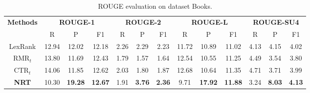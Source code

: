 \documentclass[sigconf]{acmart}
\begin{document}
\begin{table*}[!htb]
	\centering
	\caption{ROUGE evaluation on dataset Books.}
	\label{tab:rouge-books}
	\begin{tabular}{|c|c|c|c|c|c|c|c|c|c|c|c|c|}
		\hline
		\multirow{2}{*}{\textbf{Methods}} &
		\multicolumn{3}{c|}{\textbf{ROUGE-1}} &
		\multicolumn{3}{c|}{\textbf{ROUGE-2}} &
		\multicolumn{3}{c|}{\textbf{ROUGE-L}} &
		\multicolumn{3}{c|}{\textbf{ROUGE-SU4}} \\
		\cline{2-13}
		& R & P & F1 & R & P & F1& R & P & F1& R & P & F1 \\
		\hline
		LexRank & 12.94 & 12.02 & 12.18
		& 2.26 & 2.29 & 2.23
		& 11.72 & 10.89 & 11.02
		& 4.13 & 4.15 & 4.02 \\
		\hline
		RMR$_t$ & 13.80 & 11.69 & 12.43
		& 1.79 & 1.57 & 1.64
		& 12.54 & 10.55 & 11.25
		& 4.49 & 3.54 & 3.80 \\
		\hline
		CTR$_t$ & 14.06 & 11.85 & 12.62
		& 2.03 & 1.80 & 1.87
		& 12.68 & 10.64 & 11.35
		& 4.71 & 3.71 & 3.99 \\
		\hline
		\textbf{NRT} & 10.30 & \textbf{19.28} & \textbf{12.67 }
		& 1.91 & \textbf{3.76} & \textbf{2.36}
		& 9.71 & \textbf{17.92} & \textbf{11.88}
		& 3.24 & \textbf{8.03} & \textbf{4.13} \\
		\hline
		
	\end{tabular}
	\vspace{0mm}
\end{table*}
\end{document}
